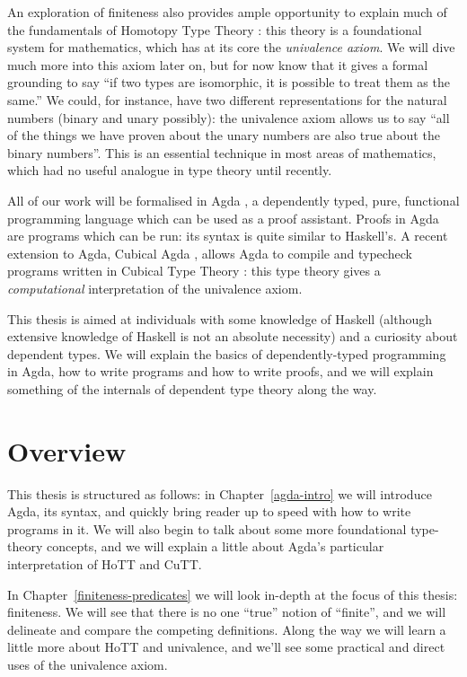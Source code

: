 An exploration of finiteness also provides ample opportunity to explain much of
the fundamentals of Homotopy Type Theory \cite{hottbook}: this theory is a
foundational system for mathematics, which has at its core the \emph{univalence
  axiom}.
We will dive much more into this axiom later on, but for now know that it gives
a formal grounding to say ``if two types are isomorphic, it is possible to treat
them as the same.''
We could, for instance, have two different representations for the natural
numbers (binary and unary possibly): the univalence axiom allows us to say ``all
of the things we have proven about the unary numbers are also true about the
binary numbers''.
This is an essential technique in most areas of mathematics, which
had no useful analogue in type theory until recently.

All of our work will be formalised in Agda
\cite{norellDependentlyTypedProgramming2008}, a
dependently typed, pure, functional programming language which can be
used as a proof assistant.
Proofs in Agda are programs which can be run: its syntax is quite similar to
Haskell's.
A recent extension to Agda, Cubical Agda
\cite{vezzosiCubicalAgdaDependently2019}, allows Agda to compile and typecheck
programs written in Cubical Type Theory \cite{cohenCubicalTypeTheory2016}: this
type theory gives a \emph{computational} interpretation of the univalence axiom.

This thesis is aimed at individuals with some knowledge of Haskell (although
extensive knowledge of Haskell is not an absolute necessity) and a curiosity
about dependent types.
We will explain the basics of dependently-typed programming in Agda, how to
write programs and how to write proofs, and we will explain something of the
internals of dependent type theory along the way.

\section{Overview}
This thesis is structured as follows: in Chapter~\ref{agda-intro} we will
introduce Agda, its syntax, and quickly bring reader up to speed with how to
write programs in it.
We will also begin to talk about some more foundational type-theory concepts,
and we will explain a little about Agda's particular interpretation of HoTT and
CuTT.

In Chapter~\ref{finiteness-predicates} we will look in-depth at the focus of
this thesis: finiteness.
We will see that there is no one ``true'' notion of ``finite'', and we will
delineate and compare the competing definitions.
Along the way we will learn a little more about HoTT and univalence, and we'll
see some practical and direct uses of the univalence axiom.

